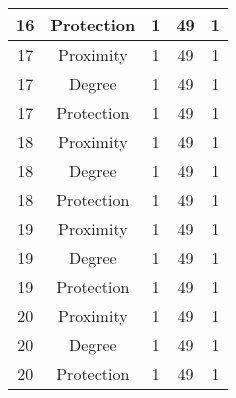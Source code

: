 \documentclass[results.tex]{subfiles}
\begin{document}
\begin{center}
\begin{tabular}{| c || c | c | c | c |}
            \hline
            16                      & Protection                   & 1                      & 49                      & 1                    \\
            \hline
            17                      & Proximity                    & 1                      & 49                      & 1                    \\
            \hline
            17                      & Degree                       & 1                      & 49                      & 1                    \\
            \hline
            17                      & Protection                   & 1                      & 49                      & 1                    \\
            \hline
            18                      & Proximity                    & 1                      & 49                      & 1                    \\
            \hline
            18                      & Degree                       & 1                      & 49                      & 1                    \\
            \hline
            18                      & Protection                   & 1                      & 49                      & 1                    \\
            \hline
            19                      & Proximity                    & 1                      & 49                      & 1                    \\
            \hline
            19                      & Degree                       & 1                      & 49                      & 1                    \\
            \hline
            19                      & Protection                   & 1                      & 49                      & 1                    \\
            \hline
            20                      & Proximity                    & 1                      & 49                      & 1                    \\
            \hline
            20                      & Degree                       & 1                      & 49                      & 1                    \\
            \hline
            20                      & Protection                   & 1                      & 49                      & 1                    \\

\end{tabular}
\end{center}
\end{document}

